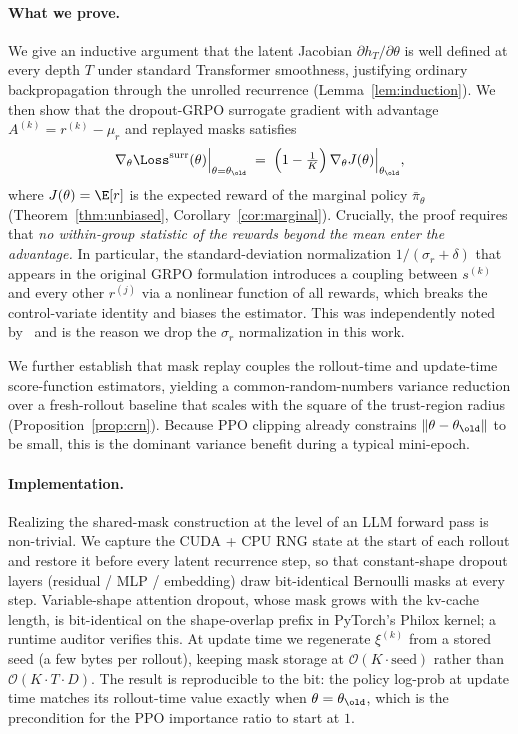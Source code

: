 \paragraph{What we prove.}
We give an inductive argument that the latent Jacobian
$\partial h_T / \partial \theta$ is well defined at every depth $T$
under standard Transformer smoothness, justifying ordinary
backpropagation through the unrolled recurrence
(Lemma~\ref{lem:induction}).  We then show that the dropout-GRPO
surrogate gradient with advantage $A^{(k)} = r^{(k)} - \mu_r$ and
replayed masks satisfies
\begin{equation}
\nabla_\theta \Loss^{\mathrm{surr}}(\theta)\Big|_{\theta = \theta_\old}
  \;=\;
\Big(1 - \tfrac{1}{K}\Big)\,\nabla_\theta J(\theta)\Big|_{\theta_\old},
\label{eq:intro-unbiased}
\end{equation}
where $J(\theta) = \E[r]$ is the expected reward of the marginal policy
$\bar\pi_\theta$ (Theorem~\ref{thm:unbiased},
Corollary~\ref{cor:marginal}).  Crucially, the proof requires that
\emph{no within-group statistic of the rewards beyond the mean enter the
advantage.}  In particular, the standard-deviation normalization
$1/(\sigma_r + \delta)$ that appears in the original GRPO formulation
introduces a coupling between $s^{(k)}$ and every other $r^{(j)}$ via a
nonlinear function of all rewards, which breaks the control-variate
identity and biases the estimator.  This was independently noted
by~\citet{liu2024drgrpo} and is the reason we drop the $\sigma_r$
normalization in this work.

We further establish that mask replay couples the rollout-time and
update-time score-function estimators, yielding a common-random-numbers
variance reduction over a fresh-rollout baseline that scales with the
square of the trust-region radius
(Proposition~\ref{prop:crn}).  Because PPO clipping already constrains
$\|\theta - \theta_\old\|$ to be small, this is the dominant variance
benefit during a typical mini-epoch.

\paragraph{Implementation.}
Realizing the shared-mask construction at the level of an LLM forward
pass is non-trivial.  We capture the CUDA + CPU RNG state at the start of
each rollout and restore it before every latent recurrence step, so that
constant-shape dropout layers (residual / MLP / embedding) draw
bit-identical Bernoulli masks at every step.  Variable-shape attention
dropout, whose mask grows with the kv-cache length, is bit-identical on
the shape-overlap prefix in PyTorch's Philox kernel; a runtime auditor
verifies this.  At update time we regenerate $\xi^{(k)}$ from a stored
seed (a few bytes per rollout), keeping mask storage at
$\mathcal{O}(K \cdot \mathrm{seed})$ rather than
$\mathcal{O}(K \cdot T \cdot D)$.  The result is reproducible to the bit:
the policy log-prob at update time matches its rollout-time value
exactly when $\theta = \theta_\old$, which is the precondition for the
PPO importance ratio to start at $1$.

